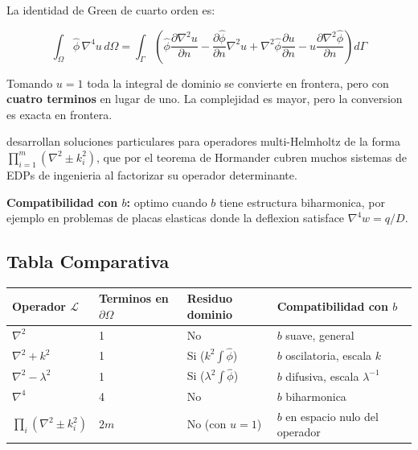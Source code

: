 \documentclass[12pt,a4paper]{article}
\begin{document}
La identidad de Green de cuarto orden es:

\begin{equation}
    \int_\Omega \hat{\phi}\,\nabla^4 u\, d\Omega
    = \int_\Gamma \left(
    \hat{\phi}\frac{\partial\nabla^2 u}{\partial n}
    - \frac{\partial\hat{\phi}}{\partial n}\nabla^2 u
    + \nabla^2\hat{\phi}\frac{\partial u}{\partial n}
    - u\frac{\partial\nabla^2\hat{\phi}}{\partial n}
    \right) d\Gamma
\end{equation}

Tomando $u = 1$ toda la integral de dominio se convierte en frontera, pero con
\textbf{cuatro terminos} en lugar de uno. La complejidad es mayor, pero la
conversion es exacta en frontera.

\cite{muleshkov2007multihelmholtz} desarrollan soluciones particulares para
operadores multi-Helmholtz de la forma
$\prod_{i=1}^m (\nabla^2 \pm k_i^2)$, que por el teorema de Hormander
\cite{tsai2009splines} cubren muchos sistemas de EDPs de ingenieria al
factorizar su operador determinante.

\textbf{Compatibilidad con $b$:} optimo cuando $b$ tiene estructura biharmonica,
por ejemplo en problemas de placas elasticas donde la deflexion satisface
$\nabla^4 w = q/D$.

\subsection{Tabla Comparativa}

\begin{center}
\begin{tabular}{llll}
\toprule
Operador $\mathcal{L}$ & Terminos en $\partial\Omega$ & Residuo dominio
    & Compatibilidad con $b$ \\
\midrule
$\nabla^2$ & 1 & No
    & $b$ suave, general \\
$\nabla^2 + k^2$ & 1 & Si ($k^2\int\hat\phi$)
    & $b$ oscilatoria, escala $k$ \\
$\nabla^2 - \lambda^2$ & 1 & Si ($\lambda^2\int\hat\phi$)
    & $b$ difusiva, escala $\lambda^{-1}$ \\
$\nabla^4$ & 4 & No
    & $b$ biharmonica \\
$\prod_i(\nabla^2 \pm k_i^2)$ & $2m$ & No (con $u=1$)
    & $b$ en espacio nulo del operador \\
\bottomrule
\end{tabular}
\end{center}

\end{document}
